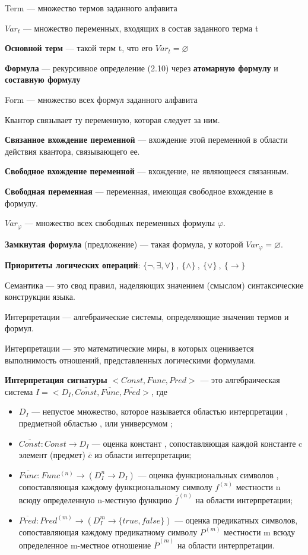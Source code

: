 \documentclass[a4paper,12pt]{article}
\begin{document}
Term --- множество термов заданного алфавита

\textbf{$Var_t$} --- множество переменных, входящих в состав заданного терма t

\textbf{Основной терм} --- такой терм t, что его $Var_t = \varnothing$

\textbf{Формула} --- рекурсивное определение (2.10) через \textbf{атомарную формулу} и \textbf{составную формулу}

Form --- множество всех формул заданного алфавита

Квантор связывает ту переменную, которая следует за ним.

\textbf{Связанное вхождение переменной} --- вхождение этой переменной в области действия квантора, связывающего ее.

\textbf{Свободное вхождение переменной} --- вхождение, не являющееся связанным.

\textbf{Свободная переменная} --- переменная, имеющая свободное вхождение в формулу.

\textbf{$Var_{\varphi}$} --- множество всех свободных переменных формулы $\varphi$.

\textbf{Замкнутая формула} (предложение) --- такая формула, у которой $Var_{\varphi} = \varnothing$.

\textbf{Приоритеты логических операций}: $\{\neg ,\exists ,\forall\}~,~\{\wedge\}~,~\{\vee\}~,~\{\rightarrow\}$

Семантика --- это свод правил, наделяющих значением (смыслом) синтаксические конструкции языка.

Интерпретации --- алгебраические системы, определяющие значения термов и формул.

Интерпретации --- это математические миры, в которых оценивается выполнимость отношений, представленных логическими формулами.

\textbf{Интерпретация сигнатуры} $<Const, Func, Pred>$ --- это алгебраическая система $I = < D_I , \overline{Const}, \overline{Func}, \overline{Pred} >$, где
\begin{itemize}
 \item $D_I$ --- непустое множество, которое называется областью интерпретации , предметной областью , или универсумом ;
 \item $\overline{Const} : Const \rightarrow D_I$ --- оценка констант , сопоставляющая каждой константе c элемент (предмет) $\overline{c}$ из области интерпретации;
 \item $\overline{Func} : Func^{(n)} \rightarrow (D_I^n \rightarrow D_I )$ --- оценка функциональных символов , сопоставляющая каждому функциональному символу $f^{(n)}$ местности n всюду определенную n-местную функцию $\overline{f}^{(n)}$ на области   интерпретации;
 \item $\overline{Pred} : Pred^{(m)} \rightarrow (D_I^m \rightarrow \{true, false\})$ --- оценка предикатных символов, сопоставляющая каждому предикатному символу $P^{(m)}$ местности m всюду определенное m-местное отношение $\overline{P}^{(m)}$ на области интерпретации.
\end{itemize}
\end{document}
